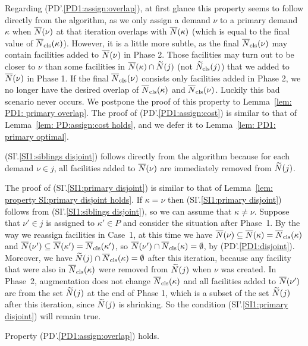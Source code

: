 Regarding (PD'.\ref{PD1:assign:overlap}), at first glance this
property seems to follow directly from the algorithm, as we only
assign a demand $\nu$ to a primary demand $\kappa$ when ${\overline{N}}(\nu)$
at that iteration overlaps with ${\overline{N}}(\kappa)$ (which is equal to
the final value of ${\overline{N}}_{{\mbox{\scriptsize\rm cls}}}(\kappa)$).  However, it is a little
more subtle, as the final ${\overline{N}}_{{\mbox{\scriptsize\rm cls}}}(\nu)$ may contain facilities
added to ${\overline{N}}(\nu)$ in Phase 2. Those facilities may turn out to be
closer to $\nu$ than some facilities in ${\overline{N}}(\kappa) \cap
{\widetilde N}(j) $ (not ${\widetilde N}_{{\mbox{\scriptsize\rm cls}}}(j)$) that we added to
${\overline{N}}(\nu)$ in Phase 1. If the final ${\overline{N}}_{{\mbox{\scriptsize\rm cls}}}(\nu)$ consists only
facilities added in Phase 2, we no longer have the desired overlap of
${\overline{N}}_{{\mbox{\scriptsize\rm cls}}}(\kappa)$ and ${\overline{N}}_{{\mbox{\scriptsize\rm cls}}}(\nu)$. Luckily this bad scenario
never occurs. We postpone the proof of this property to
Lemma~\ref{lem: PD1: primary overlap}.  The proof of
(PD'.\ref{PD1:assign:cost}) is similar to that of Lemma~\ref{lem:
  PD:assign:cost holds}, and we defer it to Lemma~\ref{lem: PD1:
  primary optimal}.

(SI'.\ref{SI1:siblings disjoint}) follows directly from the algorithm
because for each demand $\nu\in j$, all facilities added to
${\overline{N}}(\nu)$ are immediately removed from ${\widetilde N}(j)$.

The proof of (SI'.\ref{SI1:primary disjoint}) is similar to that of
Lemma~\ref{lem: property SI:primary disjoint holds}. If $\kappa=\nu$
then (SI'.\ref{SI1:primary disjoint}) follows from
(SI'.\ref{SI1:siblings disjoint}), so we can assume that
$\kappa\neq\nu$.  Suppose that $\nu'\in j$ is assigned to $\kappa'\in
P$ and consider the situation after Phase~1. By the way we reassign
facilities in Case~1, at this time we have ${\overline{N}}(\nu)\subseteq
{\overline{N}}(\kappa) = {\overline{N}}_{{\mbox{\scriptsize\rm cls}}}(\kappa)$ and ${\overline{N}}(\nu')\subseteq
{\overline{N}}(\kappa') ={\overline{N}}_{{\mbox{\scriptsize\rm cls}}}(\kappa')$, so ${\overline{N}}(\nu')\cap
{\overline{N}}_{{\mbox{\scriptsize\rm cls}}}(\kappa) = \emptyset$, by (PD'.\ref{PD1:disjoint}).
Moreover, we have ${\widetilde N}(j) \cap {\overline{N}}_{{\mbox{\scriptsize\rm cls}}}(\kappa) = \emptyset$
after this iteration, because any facility that were also in
${\overline{N}}_{{\mbox{\scriptsize\rm cls}}}(\kappa)$ were removed from ${\widetilde N}(j)$ when $\nu$ was
created. In Phase~2, augmentation does not change ${\overline{N}}_{{\mbox{\scriptsize\rm cls}}}(\kappa)$
and all facilities added to ${\overline{N}}(\nu')$ are from the set
${\widetilde N}(j)$ at the end of Phase 1, which is a subset of the set
${\widetilde N}(j)$ after this iteration, since ${\widetilde N}(j)$ is
shrinking. So the condition (SI'.\ref{SI1:primary disjoint}) will
remain true.


\begin{lemma} \label{lem: PD1: primary overlap}
  Property (PD'.\ref{PD1:assign:overlap}) holds.
\end{lemma}

